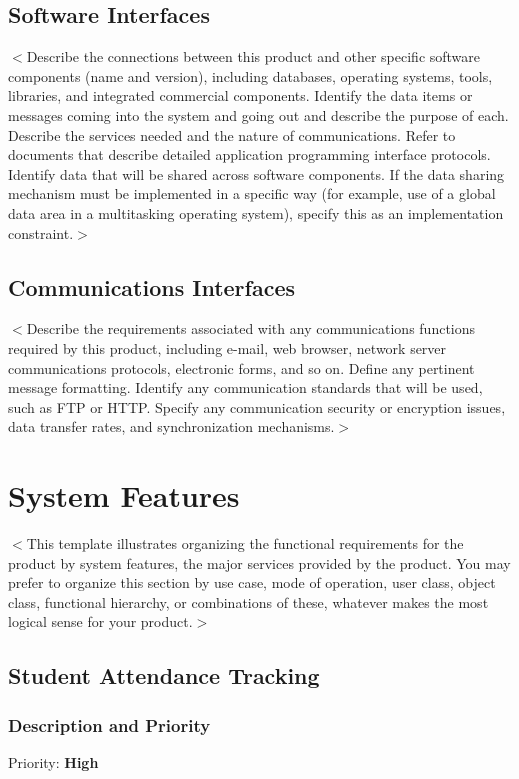 \documentclass{scrreprt}
\begin{document}
\section{Software Interfaces}
$<$Describe the connections between this product and other specific software 
components (name and version), including databases, operating systems, tools, 
libraries, and integrated commercial components. Identify the data items or 
messages coming into the system and going out and describe the purpose of each.  
Describe the services needed and the nature of communications. Refer to 
documents that describe detailed application programming interface protocols.  
Identify data that will be shared across software components. If the data 
sharing mechanism must be implemented in a specific way (for example, use of a 
global data area in a multitasking operating system), specify this as an 
implementation constraint.$>$

\section{Communications Interfaces}
$<$Describe the requirements associated with any communications functions 
required by this product, including e-mail, web browser, network server 
communications protocols, electronic forms, and so on. Define any pertinent 
message formatting. Identify any communication standards that will be used, such 
as FTP or HTTP. Specify any communication security or encryption issues, data 
transfer rates, and synchronization mechanisms.$>$


\chapter{System Features}
$<$This template illustrates organizing the functional requirements for the 
product by system features, the major services provided by the product. You may 
prefer to organize this section by use case, mode of operation, user class, 
object class, functional hierarchy, or combinations of these, whatever makes the 
most logical sense for your product.$>$

\section{Student Attendance Tracking}


\subsection{Description and Priority}
Priority: \textbf{High}
\end{document}
